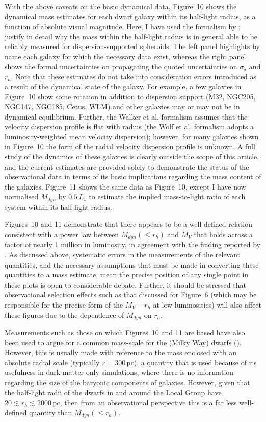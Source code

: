 \documentclass[manuscript]{aastex}
\begin{document}
With the above caveats on the basic dynamical data, Figure~10 shows
the dynamical mass estimates for each dwarf galaxy within its
half-light radius, as a function of absolute visual magnitude. Here, I
have used the formalism by \cite{walker2009c}; \cite{wolf2010} justify
in detail why the mass within the half-light radius is in general able
to be reliably measured for dispersion-supported spheroids. The left
panel highlights by name each galaxy for which the necessary data
exist, whereas the right panel shows the formal uncertainties on
propagating the quoted uncertainties on $\sigma_\star$ and $r_h$. Note
that these estimates do not take into consideration errors introduced
as a result of the dynamical state of the galaxy. For example, a few
galaxies in Figure~10 show some rotation in addition to dispersion
support (M32, NGC205, NGC147, NGC185, Cetus, WLM) and other galaxies
may or may not be in dynamical equilibrium. Further, the Walker et
al. formalism assumes that the velocity dispersion profile is flat
with radius (the Wolf et al. formalism adopts a luminosity-weighted
mean velocity dispersion); however, for many galaxies shown in
Figure~10 the form of the radial velocity dispersion profile is
unknown. A full study of the dynamics of these galaxies is clearly
outside the scope of this article, and the current estimates are
provided solely to demonstrate the status of the observational data in
terms of its basic implications regarding the mass content of the
galaxies. Figure~11 shows the same data as Figure~10, except I have
now normalised $M_{dyn}$ by $0.5\,L_\star$ to estimate the implied
mass-to-light ratio of each system within its half-light radius.

Figures~10 and 11 demonstrate that there appears to be a well 
defined relation consistent with a power law between $M_{dyn} (\le r_h)$ and $M_V$ that
holds across a factor of nearly 1 million in luminosity, in agreement
with the finding reported by \cite{walker2009c}. As discussed above,
systematic errors in the measurements of the relevant quantities, and
the necessary assumptions that must be made in converting these
quantities to a mass estimate, mean the precise position of any single
point in these plots is open to considerable debate. Further, it
should be stressed that observational selection effects such as that
discussed for Figure~6 (which may be responsible for the precise form
of the $M_V - r_h$ at low luminosities) will also affect these
figures due to the dependence of $M_{dyn}$ on $r_h$.

Measurements such as those on which Figures~10 and 11 are based have
also been used to argue for a common mass-scale for the (Milky Way)
dwarfs (\citealt{strigari2007b}). However, this is usually made with
reference to the mass enclosed with an absolute radial scale
(typically $r= 300$\,pc), a quantity that is used because of its
usefulness in dark-matter only simulations, where there is no
information regarding the size of the baryonic components of galaxies.
However, given that the half-light radii of the dwarfs in and around
the Local Group have $ 20 \lesssim r_h \lesssim 2000$\,pc, then from
an observational perspective this is a far less well-defined quantity
than $M_{dyn} (\le r_h)$.
\end{document}
